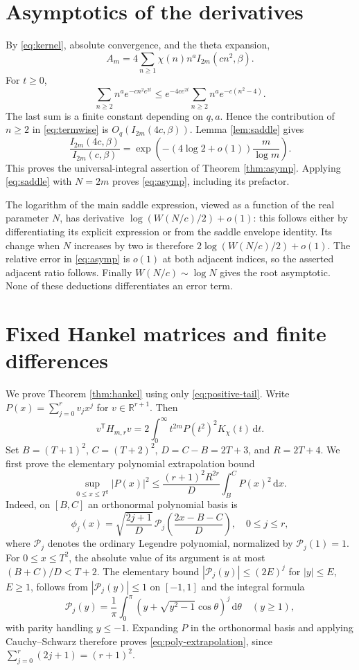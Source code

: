 \documentclass[11pt]{article}
\newcommand{\dd}{\,\mathrm d}
\newcommand{\R}{\mathbb R}
\begin{document}
\section{Asymptotics of the derivatives}
By \eqref{eq:kernel}, absolute convergence, and the theta expansion,
\begin{equation}\label{eq:termwise}
 A_m=4\sum_{n\ge1}\chi(n)n^a I_{2m}(cn^2,\beta).
\end{equation}
For $t\ge0$,
\[
 \sum_{n\ge2}n^a e^{-cn^2e^{2t}}
 \le e^{-4ce^{2t}}\sum_{n\ge2}n^a e^{-c(n^2-4)}.
\]
The last sum is a finite constant depending on $q,a$. Hence the contribution of $n\ge2$ in \eqref{eq:termwise} is $O_q(I_{2m}(4c,\beta))$. Lemma \ref{lem:saddle} gives
\[
 \frac{I_{2m}(4c,\beta)}{I_{2m}(c,\beta)}
 =\exp\!\left(-(4\log2+o(1))\frac m{\log m}\right).
\]
This proves the universal-integral assertion of Theorem \ref{thm:asymp}. Applying \eqref{eq:saddle} with $N=2m$ proves \eqref{eq:asymp}, including its prefactor.

The logarithm of the main saddle expression, viewed as a function of the real parameter $N$, has derivative $\log(W(N/c)/2)+o(1)$: this follows either by differentiating its explicit expression or from the saddle envelope identity. Its change when $N$ increases by two is therefore $2\log(W(N/c)/2)+o(1)$. The relative error in \eqref{eq:asymp} is $o(1)$ at both adjacent indices, so the asserted adjacent ratio follows. Finally $W(N/c)\sim\log N$ gives the root asymptotic. None of these deductions differentiates an error term.

\section{Fixed Hankel matrices and finite differences}
We prove Theorem \ref{thm:hankel} using only \eqref{eq:positive-tail}. Write $P(x)=\sum_{j=0}^r v_jx^j$ for $v\in\R^{r+1}$. Then
\[
 v^{\mathsf T}H_{m,r}v
 =2\int_0^\infty t^{2m}P(t^2)^2K_\chi(t)\dd t.
\]
Set $B=(T+1)^2$, $C=(T+2)^2$, $D=C-B=2T+3$, and $R=2T+4$. We first prove the elementary polynomial extrapolation bound
\begin{equation}\label{eq:poly-extrapolation}
 \sup_{0\le x\le T^2}|P(x)|^2
 \le\frac{(r+1)^2R^{2r}}{D}\int_B^C P(x)^2\dd x.
\end{equation}
Indeed, on $[B,C]$ an orthonormal polynomial basis is
\[
 \phi_j(x)=\sqrt{\frac{2j+1}{D}}\,
 \mathcal P_j\!\left(\frac{2x-B-C}{D}\right),\quad0\le j\le r,
\]
where $\mathcal P_j$ denotes the ordinary Legendre polynomial, normalized by $\mathcal P_j(1)=1$. For $0\le x\le T^2$, the absolute value of its argument is at most $(B+C)/D<T+2$. The elementary bound $|\mathcal P_j(y)|\le(2E)^j$ for $|y|\le E$, $E\ge1$, follows from $|\mathcal P_j(y)|\le1$ on $[-1,1]$ and the integral formula
\[
 \mathcal P_j(y)=\frac1\pi\int_0^\pi
 (y+\sqrt{y^2-1}\cos\theta)^j\dd\theta\quad(y\ge1),
\]
with parity handling $y\le-1$. Expanding $P$ in the orthonormal basis and applying Cauchy--Schwarz therefore proves \eqref{eq:poly-extrapolation}, since $\sum_{j=0}^r(2j+1)=(r+1)^2$.
\end{document}
